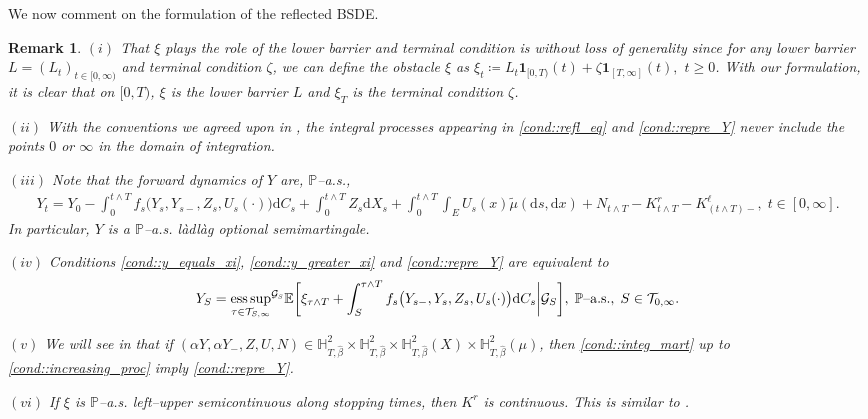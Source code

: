 \documentclass[10pt]{article} %
\newtheorem{remark}[theorem]{Remark}
\newcommand\cG{\mathcal G}
\newcommand\cT{\mathcal T}
\newcommand{\smalltext}[1]{\text{\fontsize{4}{4}\selectfont$#1$}}
\def \E{\mathbb{E}}
\def \H{\mathbb{H}}
\def \P{\mathbb{P}}
\newcommand{\1}{\mathbf{1}}
\def\d{\mathrm{d}}
\DeclareMathOperator*{\esssup}{ess\,sup}
\begin{document}
We now comment on the formulation of the reflected BSDE. 
\begin{remark}\label{rem::after_formulation}
	$(i)$ That $\xi$ plays the role of the lower barrier and terminal condition is without loss of generality since for any lower barrier $L = (L_t)_{t \in [0,\infty)}$ and terminal condition $\zeta$, we can define the obstacle $\xi$ as $\xi_t \coloneqq L_t \mathbf{1}_{[0,T)}(t) + \zeta \mathbf{1}_{[T,\infty]}(t),$ $t\geq 0$. With our formulation, it is clear that on $[0,T)$, $\xi$ is the lower barrier $L$ and $\xi_T$ is the terminal condition $\zeta$.
	
	\medskip
	$(ii)$ With the conventions we agreed upon in {\rm{}}, the integral processes appearing in \ref{cond::refl_eq} and \ref{cond::repre_Y} never include the points $0$ or $\infty$ in the domain of integration.
	
	\medskip
	$(iii)$ Note that the forward dynamics of $Y$ are, $\P${\rm--a.s.},
	\begin{align*}
			Y_t = Y_0 - \int_0^{t \land T} f_s\big(Y_s,Y_{s-},Z_s,U_s(\cdot)\big) \d C_s  + \int_0^{t \land T} Z_s \d X_s + \int_0^{t \wedge T} \int_E U_s(x)\tilde\mu(\d s, \d x) + N_{t \land T} - K^r_{t \land T} - K^{\ell}_{(t \land T)-}, \; t \in [0,\infty].
		\end{align*}
	In particular, $Y$ is a $\P${\rm--a.s.} l\`adl\`ag optional semimartingale.
	
	\medskip
	$(iv)$ Conditions \ref{cond::y_equals_xi}, \ref{cond::y_greater_xi} and \ref{cond::repre_Y} are equivalent to
	\begin{equation*}
		Y_S = {\esssup_{\tau \in \cT_{S,\infty}}}^{\cG_\smalltext{S}} \E \bigg[  \xi_{\tau \land T} + \int_S^{\tau \land T} f_s\big(Y_{s-},Y_s, Z_s, U_s(\cdot)\big) \d C_s \bigg| \cG_S \bigg], \; \text{$\P$\rm--a.s.}, \; S \in \cT_{0,\infty}.
	\end{equation*}
	
	\medskip
	$(v)$ We will see in {\rm{}} that if $(\alpha Y,\alpha Y_-,Z,U,N) \in \H^2_{T,\hat\beta} \times \H^2_{T,\hat\beta} \times \H^2_{T,\hat\beta}(X) \times \H^2_{T,\hat\beta}(\mu)$, then \ref{cond::integ_mart} up to \ref{cond::increasing_proc} imply \ref{cond::repre_Y}.
	
	\medskip
	$(vi)$
	If $\xi$ is {\rm$\P$--a.s.} left--upper semicontinuous along stopping times, then $K^r$ is continuous. This is similar to {\rm\cite[Remark 2.4]{grigorova2020optimal}}.


\end{remark}
\end{document}
